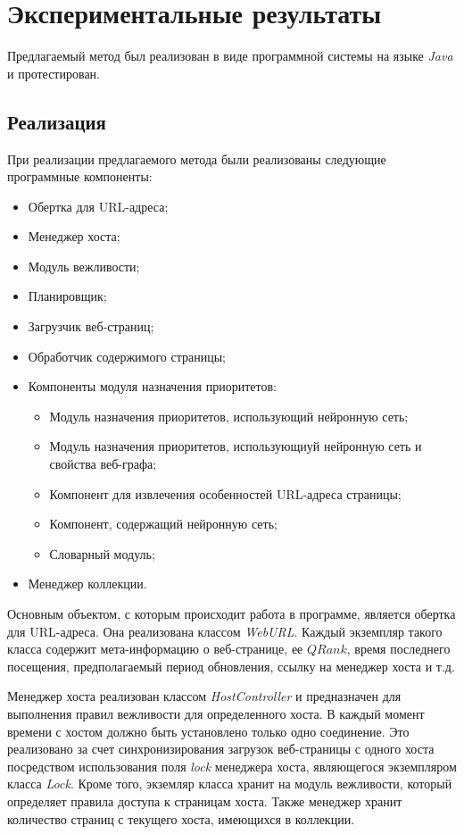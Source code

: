 \chapter{Экспериментальные результаты}
\label{chapter_experiment}

Предлагаемый метод был реализован в виде программной системы на языке \textit{Java} и протестирован.

\section{Реализация}

При реализации предлагаемого метода были реализованы следующие программные компоненты:
\begin{itemize}
\item Обертка для URL-адреса;
\item Менеджер хоста;
\item Модуль вежливости;
\item Планировщик;
\item Загрузчик веб-страниц;
\item Обработчик содержимого страницы;
\item Компоненты модуля назначения приоритетов:
\begin{itemize}
\item Модуль назначения приоритетов, использующий нейронную сеть;
\item Модуль назначения приоритетов, использующиуй нейронную сеть и свойства веб-графа;
\item Компонент для извлечения особенностей URL-адреса страницы;
\item Компонент, содержащий нейронную сеть;
\item Словарный модуль;
\end{itemize}
\item Менеджер коллекции.
\end{itemize}

Основным объектом, с которым происходит работа в программе, является обертка для URL-адреса. Она реализована классом \textit{WebURL}. Каждый экземпляр такого класса содержит мета-информацию о веб-странице, ее $QRank$, время последнего посещения, предполагаемый период обновления, ссылку на менеджер хоста и т.д.

Менеджер хоста  реализован классом \textit{HostController} и предназначен для выполнения правил вежливости для определенного хоста. В каждый момент времени с хостом должно быть установлено только одно соединение. Это реализовано за счет синхронизирования загрузок веб-страницы с одного хоста посредством использования поля \textit{lock} менеджера хоста, являющегося экземпляром класса \textit{Lock}. Кроме того, экземляр класса хранит на модуль вежливости, который определяет правила доступа к страницам хоста. Также менеджер хранит количество страниц с текущего хоста, имеющихся в коллекции.

